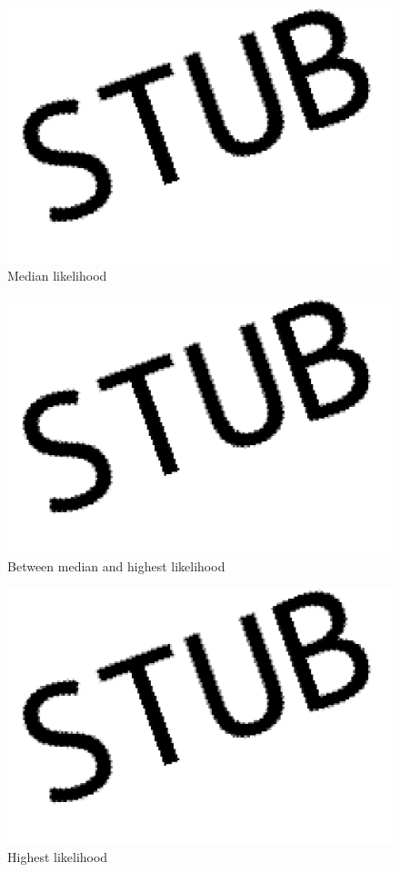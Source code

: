 \begin{figure}[H]
  \includegraphics[width=\textwidth]{pirouette_example_23/example_23/316/errors.png}
  \caption{Median likelihood}
\end{figure}


\begin{figure}[H]
  \includegraphics[width=\textwidth]{pirouette_example_23/example_23/317/errors.png}
  \caption{Between median and highest likelihood}
\end{figure}

\begin{figure}[H]
  \includegraphics[width=\textwidth]{pirouette_example_23/example_23/318/errors.png}
  \caption{Highest likelihood}
\end{figure}

